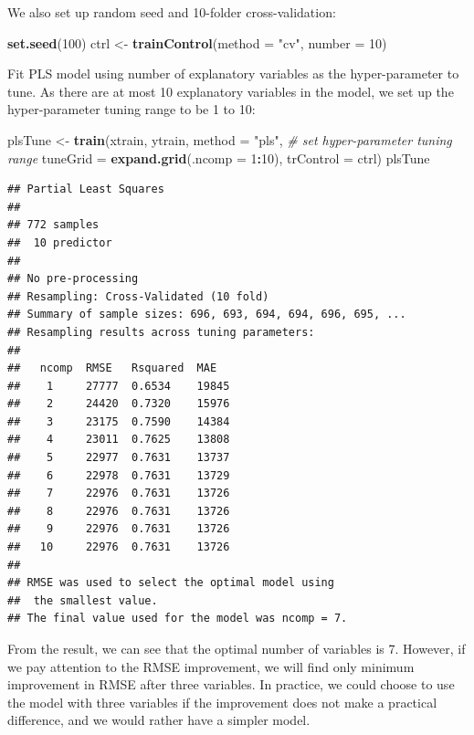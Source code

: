 \documentclass[12pt,]{krantz}
\makeatletter
\newenvironment{Shaded}{\begin{snugshade}}{\end{snugshade}}
\newcommand{\CommentTok}[1]{\textcolor[rgb]{0.37,0.37,0.37}{\textit{#1}}}
\newcommand{\DataTypeTok}[1]{\textcolor[rgb]{0.27,0.27,0.27}{#1}}
\newcommand{\DecValTok}[1]{\textcolor[rgb]{0.06,0.06,0.06}{#1}}
\newcommand{\KeywordTok}[1]{\textcolor[rgb]{0.27,0.27,0.27}{\textbf{#1}}}
\newcommand{\NormalTok}[1]{#1}
\newcommand{\OperatorTok}[1]{\textcolor[rgb]{0.43,0.43,0.43}{\textbf{#1}}}
\newcommand{\StringTok}[1]{\textcolor[rgb]{0.5,0.5,0.5}{#1}}
\newenvironment{kframe}{%
\medskip{}
\setlength{\fboxsep}{.8em}
 \def\at@end@of@kframe{}%
 \ifinner\ifhmode%
  \def\at@end@of@kframe{\end{minipage}}%
  \begin{minipage}{\columnwidth}%
 \fi\fi%
 \def\FrameCommand##1{\hskip\@totalleftmargin \hskip-\fboxsep
 \colorbox{shadecolor}{##1}\hskip-\fboxsep
     \hskip-\linewidth \hskip-\@totalleftmargin \hskip\columnwidth}%
 \MakeFramed {\advance\hsize-\width
   \@totalleftmargin\z@ \linewidth\hsize
   \@setminipage}}%
 {\par\unskip\endMakeFramed%
 \at@end@of@kframe}
\renewenvironment{Shaded}{\begin{kframe}}{\end{kframe}}
\makeatother
\begin{document}
We also set up random seed and 10-folder cross-validation:

\begin{Shaded}
\begin{Highlighting}[]
\KeywordTok{set.seed}\NormalTok{(}\DecValTok{100}\NormalTok{)}
\NormalTok{ctrl <-}\StringTok{ }\KeywordTok{trainControl}\NormalTok{(}\DataTypeTok{method =} \StringTok{"cv"}\NormalTok{, }\DataTypeTok{number =} \DecValTok{10}\NormalTok{)}
\end{Highlighting}
\end{Shaded}

Fit PLS model using number of explanatory variables as the hyper-parameter to tune. As there are at most 10 explanatory variables in the model, we set up the hyper-parameter tuning range to be 1 to 10:

\begin{Shaded}
\begin{Highlighting}[]
\NormalTok{plsTune <-}\StringTok{ }\KeywordTok{train}\NormalTok{(xtrain, ytrain, }
                 \DataTypeTok{method =} \StringTok{"pls"}\NormalTok{, }
                 \CommentTok{# set hyper-parameter tuning range}
                 \DataTypeTok{tuneGrid =} \KeywordTok{expand.grid}\NormalTok{(}\DataTypeTok{.ncomp =} \DecValTok{1}\OperatorTok{:}\DecValTok{10}\NormalTok{),}
                 \DataTypeTok{trControl =}\NormalTok{ ctrl)}
\NormalTok{plsTune}
\end{Highlighting}
\end{Shaded}

\begin{verbatim}
## Partial Least Squares 
## 
## 772 samples
##  10 predictor
## 
## No pre-processing
## Resampling: Cross-Validated (10 fold) 
## Summary of sample sizes: 696, 693, 694, 694, 696, 695, ... 
## Resampling results across tuning parameters:
## 
##   ncomp  RMSE   Rsquared  MAE  
##    1     27777  0.6534    19845
##    2     24420  0.7320    15976
##    3     23175  0.7590    14384
##    4     23011  0.7625    13808
##    5     22977  0.7631    13737
##    6     22978  0.7631    13729
##    7     22976  0.7631    13726
##    8     22976  0.7631    13726
##    9     22976  0.7631    13726
##   10     22976  0.7631    13726
## 
## RMSE was used to select the optimal model using
##  the smallest value.
## The final value used for the model was ncomp = 7.
\end{verbatim}

From the result, we can see that the optimal number of variables is 7. However, if we pay attention to the RMSE improvement, we will find only minimum improvement in RMSE after three variables. In practice, we could choose to use the model with three variables if the improvement does not make a practical difference, and we would rather have a simpler model. 
\end{document}
